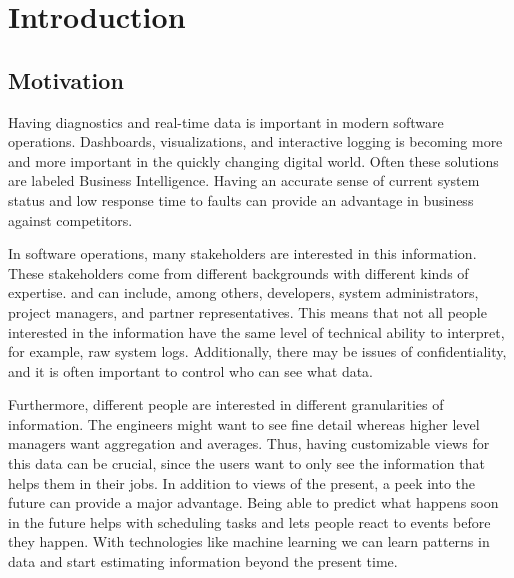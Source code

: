 
\section{Introduction}
\thispagestyle{empty}

\subsection{Motivation}
Having diagnostics and real-time data is important in modern software operations.
Dashboards, visualizations, and interactive logging is becoming more and more important
in the quickly changing digital world. Often these solutions are labeled Business Intelligence.
Having an accurate sense of current system status and low response time to faults can provide an advantage
in business against competitors.


In software operations, many stakeholders are interested in this information. 
These stakeholders come from different backgrounds with different kinds of expertise.
and can include, among others, developers, system administrators, project managers, and partner representatives.
This means that not all people interested in the information have the same level of technical ability to interpret, for example, raw system logs. 
Additionally, there may be issues of confidentiality, and it is often important to control who can see what data.

Furthermore, different people are interested in different granularities of information.
The engineers might want to see fine detail whereas higher level managers want aggregation and averages.
Thus, having customizable views for this data can be crucial,
since the users want to only see the information that helps them in their jobs.
In addition to views of the present, a peek into the future can provide a major advantage.
Being able to predict what happens soon in the future helps with scheduling tasks and lets people react 
to events before they happen. With technologies like machine learning we can learn patterns in data and 
start estimating information beyond the present time.

